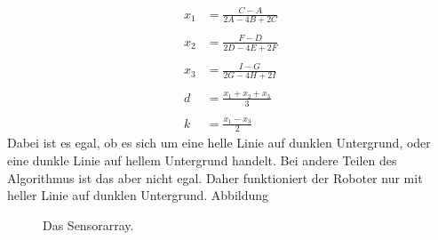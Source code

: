 \documentclass[a4paper,bibtotoc,oneside]{scrbook}
\begin{document}
\begin{align*}
  x_1 &= \frac{C-A}{2A-4B+2C} \\
  \\
  x_2 &=  \frac{F-D}{2D-4E+2F} \\
  \\
  x_3 &=  \frac{I-G}{2G-4H+2I} \\
  \\
  d &=  \frac{x_1+x_2+x_3}{3} \\
  \\
  k &=  \frac{x_1-x_3}{2}
\end{align*}
Dabei ist es egal, ob es sich um eine helle Linie auf dunklen Untergrund, oder eine dunkle Linie auf hellem Untergrund handelt. Bei andere Teilen des Algorithmus ist das aber nicht egal. Daher funktioniert der Roboter nur mit heller Linie auf dunklen Untergrund.  Abbildung 

\begin{figure}
\centering
\caption{Das Sensorarray.}
\label{arr}
\end{figure} 
\end{document}
